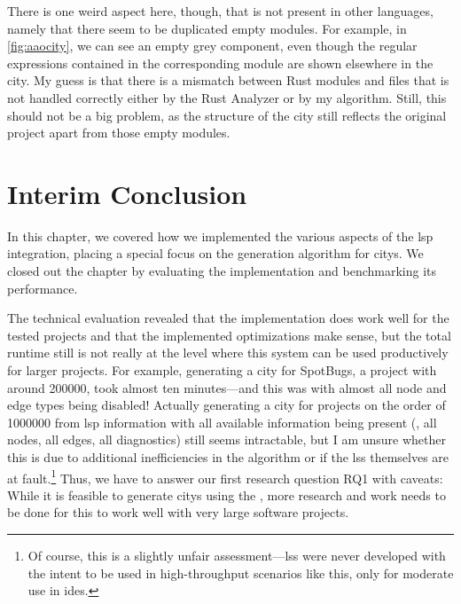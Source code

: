 \documentclass[../thesis]{subfiles}
\begin{document}
There is one weird aspect here, though, that is not present in other languages, namely that there seem to be duplicated empty modules.
For example, in \cref{fig:aaocity}, we can see an empty grey  component, even though the regular expressions contained in the corresponding module are shown elsewhere in the city.
My guess is that there is a mismatch between Rust modules and files that is not handled correctly either by the Rust Analyzer or by my algorithm.
Still, this should not be a big problem, as the structure of the \gls{city} still reflects the original project apart from those empty modules.

\section{Interim Conclusion}\label{sec:implconclusion}
In this chapter, we covered how we implemented the various aspects of the \gls{lsp} integration, placing a special focus on the generation algorithm for \glspl{city}.
We closed out the chapter by evaluating the implementation and benchmarking its performance.

The technical evaluation revealed that the implementation does work well for the tested projects and that the implemented optimizations make sense, but the total runtime still is not really at the level where this system can be used productively for larger projects.
For example, generating a city for SpotBugs, a project with around \qty{200000}{\loc}, took almost ten minutes---and this was with almost all node and edge types being disabled!
Actually generating a \gls{city} for projects on the order of \qty{1000000}{\loc} from \gls{lsp} information with all available information being present (\ie, all nodes, all edges, all diagnostics) still seems intractable, but I am unsure whether this is due to additional inefficiencies in the algorithm or if the \glspl{ls} themselves are at fault.\footnote{
	Of course, this is a slightly unfair assessment---\glspl{ls} were never developed with the intent to be used in high-throughput scenarios like this, only for moderate use in \glspl{ide}.
}
Thus, we have to answer our first research question \textsf{RQ1} with caveats:
While it is feasible to generate \glspl{city} using the , more research and work needs to be done for this to work well with very large software projects.
\end{document}
